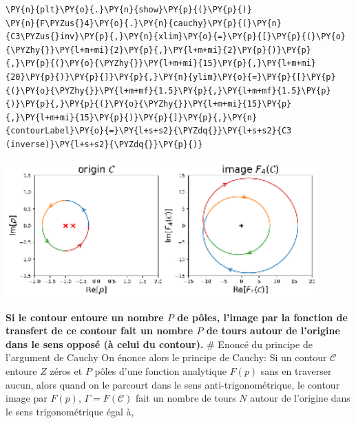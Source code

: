 \begin{tcolorbox}[breakable, size=fbox, boxrule=1pt, pad at break*=1mm,colback=cellbackground, colframe=cellborder]
\begin{Verbatim}[commandchars=\\\{\}]
\PY{n}{plt}\PY{o}{.}\PY{n}{show}\PY{p}{(}\PY{p}{)}
\PY{n}{F\PYZus{}4}\PY{o}{.}\PY{n}{cauchy}\PY{p}{(}\PY{n}{C3\PYZus{}inv}\PY{p}{,}\PY{n}{xlim}\PY{o}{=}\PY{p}{[}\PY{p}{(}\PY{o}{\PYZhy{}}\PY{l+m+mi}{2}\PY{p}{,}\PY{l+m+mi}{2}\PY{p}{)}\PY{p}{,}\PY{p}{(}\PY{o}{\PYZhy{}}\PY{l+m+mi}{15}\PY{p}{,}\PY{l+m+mi}{20}\PY{p}{)}\PY{p}{]}\PY{p}{,}\PY{n}{ylim}\PY{o}{=}\PY{p}{[}\PY{p}{(}\PY{o}{\PYZhy{}}\PY{l+m+mf}{1.5}\PY{p}{,}\PY{l+m+mf}{1.5}\PY{p}{)}\PY{p}{,}\PY{p}{(}\PY{o}{\PYZhy{}}\PY{l+m+mi}{15}\PY{p}{,}\PY{l+m+mi}{15}\PY{p}{)}\PY{p}{]}\PY{p}{,}\PY{n}{contourLabel}\PY{o}{=}\PY{l+s+s2}{\PYZdq{}}\PY{l+s+s2}{C3 (inverse)}\PY{l+s+s2}{\PYZdq{}}\PY{p}{)}
\end{Verbatim}
\end{tcolorbox}
\begin{center}
    \includegraphics[width=0.9\textwidth]{notebook/fig/output_43_1.eps}
\end{center}
\textbf{Si le contour entoure un nombre \(P\) de pôles, l'image par la
fonction de transfert de ce contour fait un nombre \(P\) de tours autour
de l'origine dans le sens opposé (à celui du contour).} \# Enoncé du
principe de l'argument de Cauchy On énonce alors le principe de Cauchy:
Si un contour \(\mathcal{C}\) entoure \(Z\) zéros et \(P\) pôles d'une
fonction analytique \(F(p)\) sans en traverser aucun, alors quand on le
parcourt dans le sens anti-trigonométrique, le contour image par
\(F(p)\), \(\Gamma=F(\mathcal{C})\) fait un nombre de tours \(N\) autour
de l'origine dans le sens trigonométrique égal à,

